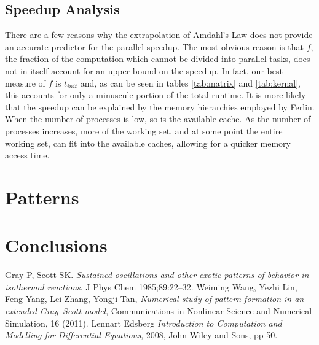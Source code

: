 \documentclass[a4paper,11pt]{article}
\begin{document}
\subsection*{Speedup Analysis}
There are a few reasons why the extrapolation of Amdahl's Law does not provide an accurate predictor for the parallel speedup.  The most obvious reason is that $f$, the fraction of the computation which cannot be divided into parallel tasks, does not in itself account for an upper bound on the speedup.  In fact, our best measure of $f$ is $t_{init}$ and, as can be seen in tables \ref{tab:matrix} and \ref{tab:kernal}, this accounts for only a minuscule portion of the total runtime.  It is more likely that the speedup can be explained by the memory hierarchies employed by Ferlin.  When the number of processes is low, so is the available cache.  As the number of processes increases, more of the working set, and at some point the entire working set, can fit into the available caches, allowing for a quicker memory access time.  

\section*{Patterns}
\section*{Conclusions}

\clearpage
\begin{thebibliography}{}
 Gray P, Scott SK. {\it Sustained oscillations and other exotic patterns of behavior in isothermal reactions}. J Phys Chem 1985;89:22–32.
 Weiming Wang, Yezhi Lin, Feng Yang, Lei Zhang, Yongji Tan, {\it Numerical study of pattern formation in an extended Gray–Scott model}, Communications in Nonlinear Science and Numerical Simulation, 16 (2011).
 Lennart Edsberg {\it Introduction to Computation and Modelling for Differential Equations}, 2008, John Wiley and Sons, pp 50.
\end{thebibliography}
\end{document}
